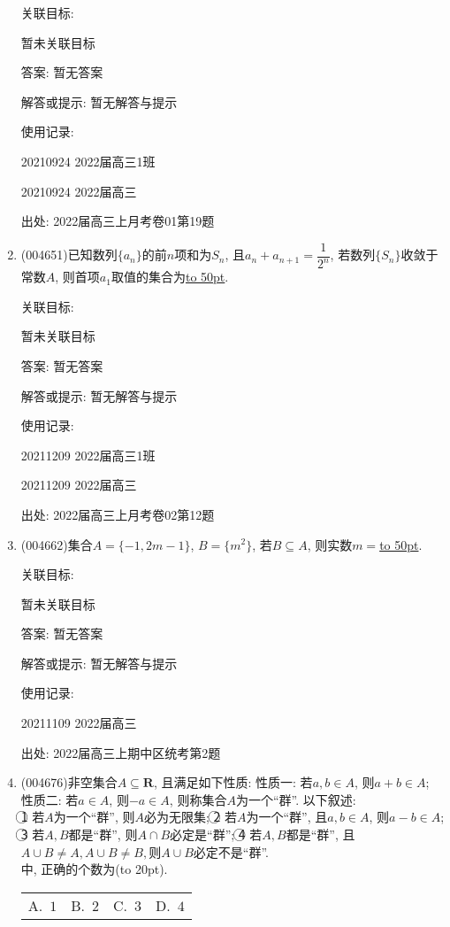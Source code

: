 \documentclass[10pt,a4paper]{article}
\newcommand{\blank}[1]{\underline{\hbox to #1pt{}}}
\newcommand{\bracket}[1]{(\hbox to #1pt{})}
\newcommand{\fourch}[4]{\par\begin{tabular}{p{.23\textwidth}p{.23\textwidth}p{.23\textwidth}p{.23\textwidth}}
A.~#1 &B.~#2& C.~#3& D.~#4
\end{tabular}}
\begin{document}
\begin{enumerate}[1.]
关联目标:

暂未关联目标

答案: 暂无答案

解答或提示: 暂无解答与提示

使用记录:

20210924	2022届高三1班		

20210924	2022届高三		


出处: 2022届高三上月考卷01第19题
\item { (004651)}已知数列$\{a_n\}$的前$n$项和为$S_n$, 且$a_n+a_{n+1}=\dfrac 1{2^n}$, 若数列$\{S_n\}$收敛于常数$A$, 则首项$a_1$取值的集合为\blank{50}.


关联目标:

暂未关联目标

答案: 暂无答案

解答或提示: 暂无解答与提示

使用记录:

20211209	2022届高三1班	

20211209	2022届高三	


出处: 2022届高三上月考卷02第12题
\item { (004662)}集合$A=\{-1, 2m-1\}$, $B=\{m^2\}$, 若$B\subseteq A$, 则实数$m=$\blank{50}.


关联目标:

暂未关联目标

答案: 暂无答案

解答或提示: 暂无解答与提示

使用记录:

20211109	2022届高三	


出处: 2022届高三上期中区统考第2题
\item { (004676)}非空集合$A\subseteq \mathbf{R}$, 且满足如下性质:
性质一: 若$a,b\in A$, 则$a+b\in A$;
性质二: 若$a\in A$, 则$-a\in A$, 则称集合$A$为一个``群''. 以下叙述:\\
\textcircled{1} 若$A$为一个``群'', 则$A$必为无限集;
\textcircled{2} 若$A$为一个``群'', 且$a,b\in A$, 则$a-b\in A$;
\textcircled{3} 若$A,B$都是``群'', 则$A\cap B$必定是``群'';
\textcircled{4} 若$A,B$都是``群'', 且$A\cup B\ne A,A\cup B\ne B,$则$A\cup B$必定不是``群''.\\
中, 正确的个数为\bracket{20}.
\fourch{$1$}{$2$}{$3$}{$4$}



\end{enumerate}
\end{document}

